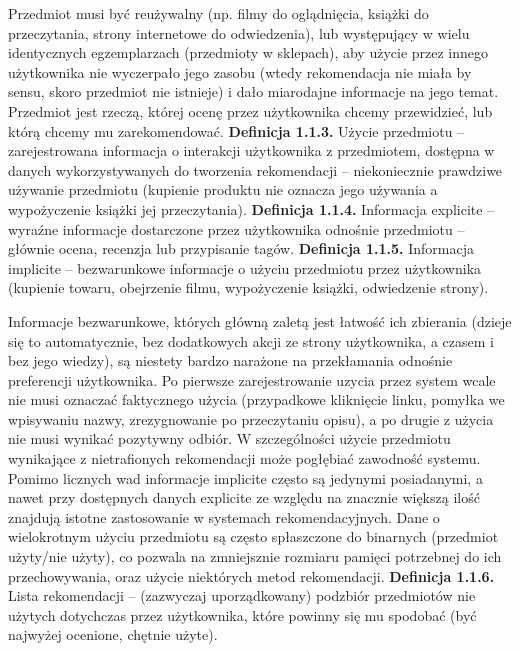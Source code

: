 \documentclass{pracamgr}
\begin{document}
    Przedmiot musi być reużywalny (np. filmy do oglądnięcia, książki do przeczytania, strony internetowe do odwiedzenia),
    lub występujący w wielu identycznych egzemplarzach (przedmioty w sklepach), aby użycie przez innego użytkownika nie wyczerpało jego zasobu
    (wtedy rekomendacja nie miała by sensu, skoro przedmiot nie istnieje) i dało miarodajne informacje na jego temat.
    Przedmiot jest rzeczą, której ocenę przez użytkownika chcemy przewidzieć, lub którą chcemy mu zarekomendować.\newline\newline
   \textbf{Definicja 1.1.3.} Użycie przedmiotu -- zarejestrowana informacja o interakcji użytkownika z przedmiotem,
   dostępna w danych wykorzystywanych do tworzenia rekomendacji -- niekoniecznie prawdziwe używanie przedmiotu
   (kupienie produktu nie oznacza jego używania a wypożyczenie książki jej przeczytania). \newline\newline
   \textbf{Definicja 1.1.4.} Informacja explicite -- wyraźne informacje dostarczone przez użytkownika odnośnie przedmiotu -- głównie
    ocena, recenzja lub przypisanie tagów.\newline\newline
   \textbf{Definicja 1.1.5.} Informacja implicite -- bezwarunkowe informacje o użyciu przedmiotu przez użytkownika
    (kupienie towaru, obejrzenie filmu, wypożyczenie książki, odwiedzenie strony).\newline
    
    Informacje bezwarunkowe, których główną zaletą jest łatwość ich zbierania
    (dzieje się to automatycznie, bez dodatkowych akcji ze strony użytkownika, a czasem i bez jego wiedzy),
    są niestety bardzo narażone na przekłamania odnośnie preferencji użytkownika.
    Po pierwsze zarejestrowanie uzycia przez system wcale nie musi oznaczać faktycznego użycia
    (przypadkowe kliknięcie linku, pomyłka we wpisywaniu nazwy, zrezygnowanie po przeczytaniu opisu), 
    a po drugie z użycia nie musi wynikać pozytywny odbiór.
    W szczególności użycie przedmiotu wynikające z nietrafionych rekomendacji może pogłębiać zawodność systemu.
    Pomimo licznych wad informacje implicite często są jedynymi posiadanymi, a nawet przy dostępnych danych explicite ze względu na
    znacznie większą ilość znajdują istotne zastosowanie w systemach rekomendacyjnych.
    Dane o wielokrotnym użyciu przedmiotu są często spłaszczone do binarnych (przedmiot użyty/nie użyty),
    co pozwala na zmniejsznie rozmiaru pamięci potrzebnej do ich przechowywania, oraz użycie niektórych metod rekomendacji.\newline\newline
   \textbf{Definicja 1.1.6.} Lista rekomendacji -- (zazwyczaj uporządkowany) podzbiór przedmiotów nie użytych dotychczas przez użytkownika,
    które powinny się mu spodobać (być najwyżej ocenione, chętnie użyte).
    
\end{document}
